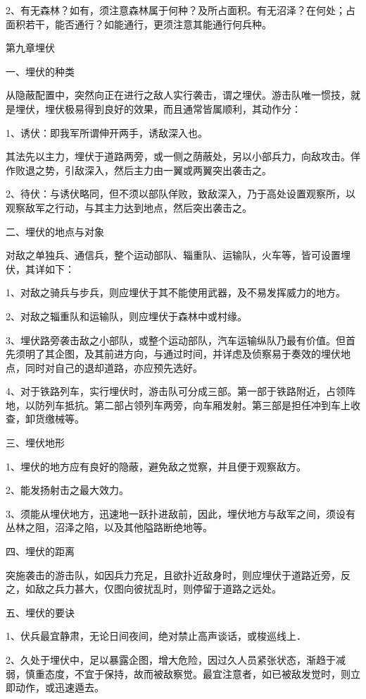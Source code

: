 2、有无森林？如有，须注意森林属于何种？及所占面积。有无沼泽？在何处；占面积若干，能否通行？如能通行，更须注意其能通行何兵种。

第九章埋伏

一、埋伏的种类

从隐蔽配置中，突然向正在进行之敌人实行袭击，谓之埋伏。游击队唯一惯技，就是埋伏，埋伏极易得到良好的效果，而且通常皆属顺利，其动作分：

1、诱伏：即我军所谓伸开两手，诱敌深入也。

其法先以主力，埋伏于道路两旁，或一侧之荫蔽处，另以小部兵力，向敌攻击。佯作败退之势，引敌深入，然后主力由一翼或两翼突出袭击之。

2、待伏：与诱伏略同，但不须以部队佯败，致敌深入，乃于高处设置观察所，以观察敌军之行动，与其主力达到地点，然后突出袭击之。

二、埋伏的地点与对象

对敌之单独兵、通信兵，整个运动部队、辎重队、运输队，火车等，皆可设置埋伏，其详如下：

1、对敌之骑兵与步兵，则应埋伏于其不能使用武器，及不易发挥威力的地方。

2、对敌之辎重队和运输队，则应埋伏于森林中或村缘。

3、埋伏路旁袭击敌之小部队，或整个运动部队，汽车运输纵队乃最有价值。但首先须明了其企图，及其前进方向，与通过时间，并详虑及侦察易于奏效的埋伏地点，同时对自己的退却道路，亦应预先选好。

4、对于铁路列车，实行埋伏时，游击队可分成三部。第一部于铁路附近，占领阵地，以防列车抵抗。第二部占领列车两旁，向车厢发射。第三部是担任冲到车上收查，卸货缴械等。

三、埋伏地形

1、埋伏的地方应有良好的隐蔽，避免敌之觉察，并且便于观察敌方。

2、能发扬射击之最大效力。

3、须能从埋伏地方，迅速地一跃扑进敌前，因此，埋伏地方与敌军之间，须设有丛林之阻，沼泽之陷，以及其他隘路断绝地等。

四、埋伏的距离

突施袭击的游击队，如因兵力充足，且欲扑近敌身时，则应埋伏于道路近旁，反之，如敌之兵力甚大，仅图向彼扰乱时，则停留于道路之远处。

五、埋伏的要诀

1、伏兵最宜静肃，无论日间夜间，绝对禁止高声谈话，或梭巡线上．

2、久处于埋伏中，足以暴露企图，增大危险，因过久人员紧张状态，渐趋于减弱，慎重态度，不宜于保持，故而被敌察觉。最宜注意者，如已被敌发觉时，则立即动作，或迅速遁去。

